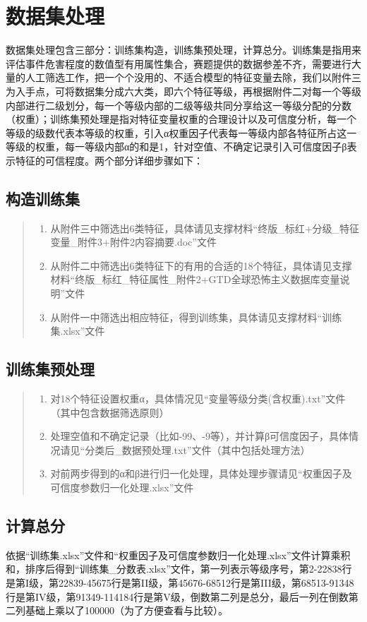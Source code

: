 \documentclass{cumcmthesis}
\begin{document}
\newpage
\section{数据集处理}
数据集处理包含三部分：训练集构造，训练集预处理，计算总分。训练集是指用来评估事件危害程度的数值型有用属性集合，赛题提供的数据参差不齐，需要进行大量的人工筛选工作，把一个个没用的、不适合模型的特征变量去除，我们以附件三为入手点，可将数据集分成六大类，即六个特征等级，再根据附件二对每一个等级内部进行二级划分，每一个等级内部的二级等级共同分享给这一等级分配的分数（权重）；训练集预处理是指对特征变量权重的合理设计以及可信度分析，每一个等级的级数代表本等级的权重，引入α权重因子代表每一等级内部各特征所占这一等级的权重，每一等级内部α的和是1，针对空值、不确定记录引入可信度因子β表示特征的可信程度。两个部分详细步骤如下：
\subsection{构造训练集}
\begin{quote}
	\begin{enumerate} 
	 \item 从附件三中筛选出6类特征，具体请见支撑材料“终版\_标红+分级\_特征变量\_附件3+附件2内容摘要.doc”文件
	 \item 从附件二中筛选出6类特征下的有用的合适的18个特征，具体请见支撑材料“终版\_标红\_特征属性\_附件2+GTD全球恐怖主义数据库变量说明”文件
	 \item 从附件一中筛选出相应特征，得到训练集，具体请见支撑材料“训练集.xlsx”文件
	\end{enumerate} 
\end{quote}
	
\subsection{训练集预处理}
\begin{quote}
	\begin{enumerate} 
	\item 对18个特征设置权重α，具体情况见“变量等级分类(含权重).txt”文件（其中包含数据筛选原则）
	\item 处理空值和不确定记录（比如-99、-9等），并计算β可信度因子，具体情况请见“分类后\_数据预处理.txt”文件（其中包括处理方法）
	\item 对前两步得到的α和β进行归一化处理，具体处理步骤请见“权重因子及可信度参数归一化处理.xlsx”文件
	\end{enumerate} 
\end{quote}

\subsection{计算总分}
依据“训练集.xlsx”文件和“权重因子及可信度参数归一化处理.xlsx”文件计算乘积和，排序后得到“训练集\_分数表.xlsx”文件，第一列表示等级序号，第2-22838行是第I级，第22839-45675行是第II级，第45676-68512行是第III级，第68513-91348行是第IV级，第91349-114184行是第V级，倒数第二列是总分，最后一列在倒数第二列基础上乘以了100000（为了方便查看与比较）。
\end{document}
